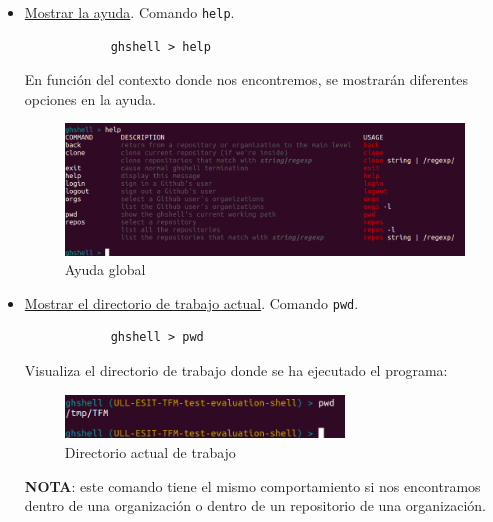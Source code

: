 	\begin{itemize}
		\item \underline{Mostrar la ayuda}. Comando \verb|help|.
		
		\begin{verbatim}
			ghshell > help
		\end{verbatim}
		
		En función del contexto donde nos encontremos, se mostrarán diferentes opciones en la ayuda.
		
		\begin{figure}[H]
		\begin{center}
		\includegraphics[width=1\textwidth]{images/help1-1}
		\caption{Ayuda global}
		\label{fig:help1-1}
		\end{center}
		\end{figure}
		
		\item \underline{Mostrar el directorio de trabajo actual}. Comando \verb|pwd|.
		
		\begin{verbatim}
			ghshell > pwd
		\end{verbatim}
		
		Visualiza el directorio de trabajo donde se ha ejecutado el programa:
		
		\begin{figure}[H]
		\begin{center}
		\includegraphics[width=0.7\textwidth]{images/pwd}
		\caption{Directorio actual de trabajo}
		\label{fig:pwd}
		\end{center}
		\end{figure}
		
		{\bfseries NOTA}: este comando tiene el mismo comportamiento si nos encontramos dentro de una organización o dentro de un repositorio de una organización.
		\newpage
		

\end{itemize}
